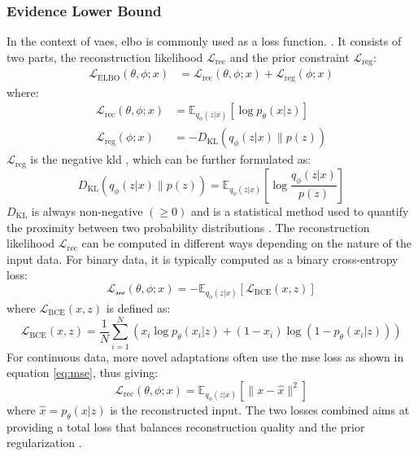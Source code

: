 \subsubsection{Evidence Lower Bound}
\label{back:elbo}
In the context of \acrshort{vae}s, \acrshort{elbo} is commonly used as a loss function. \cite{lygerakis2024edvaeentropydecompositionelbo}. It consists of two parts, the reconstruction likelihood $\mathcal{L}_{\text{rec}}$ and the prior constraint $\mathcal{L}_{\text{reg}}$:
\begin{align}
\mathcal{L}_{\text{ELBO}}(\theta, \phi; x) &= \mathcal{L}_{\text{rec}}(\theta, \phi; x) + \mathcal{L}_{\text{reg}}(\phi; x)  
\end{align}
where:
\begin{align}
\mathcal{L}_{\text{rec}}(\theta, \phi; x) &= \mathbb{E}_{q_\phi(z|x)}[\log p_\theta(x|z)] \\
\mathcal{L}_{\text{reg}}(\phi; x) &= -D_{\text{KL}}(q_\phi(z|x) \| p(z))
\end{align}
$\mathcal{L}_{\text{reg}}$ is the negative \acrfull{kld} \cite{10.1214/aoms/1177729694}, which can be further formulated as:
\begin{equation}
    D_{\text{KL}}(q_\phi(z|x) \| p(z)) = \mathbb{E}_{q_\phi(z|x)}\left[\log \frac{q_\phi(z|x)}{p(z)}\right]
\end{equation}
$D_{\text{KL}}$ is always non-negative $(\geq 0)$ and is a statistical method used to quantify the proximity between two probability distributions \cite{shlens2014notes}. 
The reconstruction likelihood $\mathcal{L}_{\text{rec}}$ can be computed in different ways depending on the nature of the input data. For binary data, it is typically computed as a binary cross-entropy loss:
\begin{equation}
\mathcal{L_\text{rec}}(\theta, \phi; x) = - \mathbb{E}_{q_\phi(z|x)}[\mathcal{L}_{\text{BCE}}(x, z)]
\end{equation}
where $\mathcal{L}_{\text{BCE}}(x, z)$ is defined as:
\begin{equation}
\mathcal{L}_{\text{BCE}}(x, z) = \frac{1}{N} \sum_{i=1}^{N} \left( x_i \log p_\theta(x_i|z) + (1 - x_i) \log(1 - p_\theta(x_i|z)) \right)
\end{equation}
For continuous data, more novel adaptations \cite{lygerakis2024edvaeentropydecompositionelbo} often use the \acrshort{mse} loss as shown in equation \ref{eq:mse}, thus giving:
\begin{equation}
    \mathcal{L}_{\text{rec}}(\theta, \phi; x) = \mathbb{E}_{q_\phi(z|x)}[\|x - \hat{x}\|^2]
\end{equation}
where $\hat{x} = p_\theta(x|z)$ is the reconstructed input.
The two losses combined aims at providing a total loss that balances reconstruction quality and the prior regularization \cite{lin2019balancingreconstructionqualityregularisation}.

